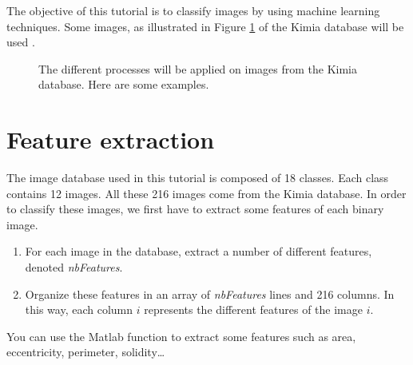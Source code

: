 \def\difficulty{2}

\vspace*{10pt}
\begin{note}The objective of this tutorial is to classify images by using machine learning techniques. Some images, as illustrated in Figure \ref{fig:machine_learning:enonce:examples} of the Kimia database will be used \cite{KimiaDB,Sharvit1998}.\end{note}

\begin{figure}[H]
\centering\caption{The different processes will be applied on images from the Kimia database. Here are some examples.}%
\hfill
{}
\hfill
{}
\hfill
{}%
\label{fig:machine_learning:enonce:examples}\vspace*{-10pt}%
\end{figure}


\section{Feature extraction}
The image database used in this tutorial is composed of 18 classes. Each class contains 12 images. All these 216 images come from the Kimia database. In order to classify these images, we first have to extract some features of each binary image. 


\begin{qbox}
\begin{enumerate}
	\item For each image in the database, extract a number of different features, denoted \textsl{nbFeatures}.
	\item Organize these features in an array of \textsl{nbFeatures} lines and 216 columns. In this way, each column $i$ represents the different features of the image $i$.
\end{enumerate}
\end{qbox}

\begin{mcomment}
\begin{mremark}
You can use the Matlab function  to extract some features such as area, eccentricity, perimeter, solidity\dots
\end{mremark}
\end{mcomment}

